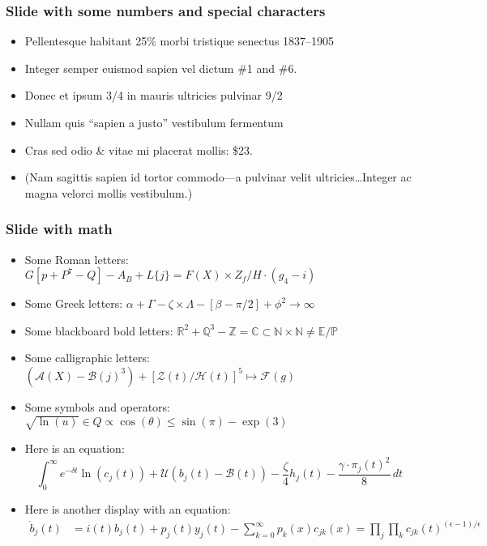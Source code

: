 \documentclass[11pt,xcolor={dvipsnames},hyperref={pdftex,pdfpagemode=UseNone,hidelinks,pdfdisplaydoctitle=true},usepdftitle=false]{beamer}
\begin{document}
\begin{frame}
\end{frame}

\begin{frame}
\frametitle{Slide with some numbers and special characters} 
\begin{itemize}
\item Pellentesque habitant 25\% morbi tristique senectus 1837--1905
\item Integer semper euismod sapien vel dictum \#1 and \#6.
\item  Donec et ipsum 3/4 in mauris ultricies pulvinar 9/2
\item Nullam quis ``sapien a justo'' vestibulum fermentum
\item Cras sed odio \& vitae mi placerat mollis: \$23.
\item (Nam sagittis sapien id tortor commodo---a pulvinar velit ultricies\ldots Integer ac magna velorci mollis vestibulum.)
\end{itemize}	
\end{frame}

\begin{frame}
\frametitle{Slide with math}
\begin{itemize}
\item Some Roman letters: $G[p + P^7-Q] - A_B + L\{j\} = F(X) \times Z_f/H \cdot (g_4 - i)$
\item Some Greek letters: $\alpha + \Gamma - \zeta \times \Lambda - [\beta - \pi/2] + \phi^2 \to \infty$
\item Some blackboard bold letters: $\mathbb{R}^2 + \mathbb{Q}^3 - \mathbb{Z} = \mathbb{C} \subset \mathbb{N} \times \mathbb{N} \neq \mathbb{E} / \mathbb{P}$
\item Some calligraphic letters: $(\mathcal{A}(X) - \mathcal{B}(j)^3) + [\mathcal{Z}(t) / \mathcal{H}(t)]^5 \mapsto \mathcal{F}(g) $
\item Some symbols and operators: $\sqrt{\ln(u)} \in Q \propto \cos(\theta) \leq \sin(\pi) - \exp(3)$
\item Here is an equation:
\begin{equation*}
\int_{0}^{\infty}e^{-\delta t} \ln(c_{j}(t))+ \mathcal{U}(b_{j}(t) - \mathcal{B}(t))- \frac{\zeta}{4} h_{j}(t) -\frac{\gamma \cdot \pi_{j}(t)^2}{8}\,dt
\end{equation*}
\item Here is another display with an equation:
\begin{align*}
\dot{b}_{j}(t) &= i(t) b_{j}(t) + p_{j}(t)  y_{j}(t) - \sum_{k=0}^{\infty} p_{k}(x) c_{jk}(x) = \prod_{j} \prod_{k} c_{jk}(t)^{(\epsilon-1)/\epsilon} 
\end{align*}
\end{itemize}
\end{frame}
\end{document}
